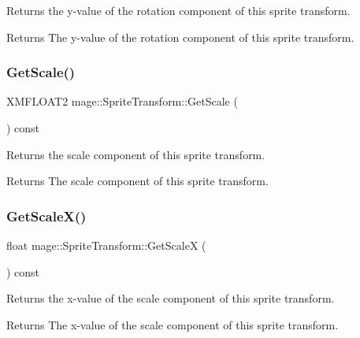 Returns the y-\/value of the rotation component of this sprite transform.

\begin{DoxyReturn}{Returns}
The y-\/value of the rotation component of this sprite transform. 
\end{DoxyReturn}
\hypertarget{structmage_1_1_sprite_transform_ab9a7dcdbf3013960942ff98df313a92d}{}\label{structmage_1_1_sprite_transform_ab9a7dcdbf3013960942ff98df313a92d} 
\subsubsection{\texorpdfstring{Get\+Scale()}{GetScale()}}
{\footnotesize\ttfamily X\+M\+F\+L\+O\+A\+T2 mage\+::\+Sprite\+Transform\+::\+Get\+Scale (\begin{DoxyParamCaption}{ }\end{DoxyParamCaption}) const}

Returns the scale component of this sprite transform.

\begin{DoxyReturn}{Returns}
The scale component of this sprite transform. 
\end{DoxyReturn}
\hypertarget{structmage_1_1_sprite_transform_ae192203af55097b4e296ce0cb916cd97}{}\label{structmage_1_1_sprite_transform_ae192203af55097b4e296ce0cb916cd97} 
\subsubsection{\texorpdfstring{Get\+Scale\+X()}{GetScaleX()}}
{\footnotesize\ttfamily float mage\+::\+Sprite\+Transform\+::\+Get\+ScaleX (\begin{DoxyParamCaption}{ }\end{DoxyParamCaption}) const}

Returns the x-\/value of the scale component of this sprite transform.

\begin{DoxyReturn}{Returns}
The x-\/value of the scale component of this sprite transform. 
\end{DoxyReturn}
\hypertarget{structmage_1_1_sprite_transform_ad25f6881510e258a5afb00ae9ad7bc87}{}\label{structmage_1_1_sprite_transform_ad25f6881510e258a5afb00ae9ad7bc87} 
